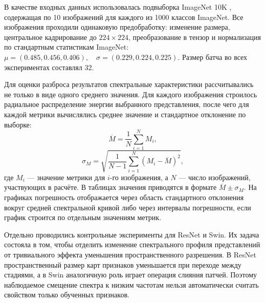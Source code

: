 В качестве входных данных использовалась подвыборка ImageNet 10K \cite{priyerana_imagenet10k}, содержащая по 10 изображений для каждого из 1000 классов ImageNet. Все изображения проходили одинаковую предобработку: изменение размера, центральное кадрирование до $224\times224$, преобразование в тензор и нормализация по стандартным статистикам ImageNet:
$ \mu = (0.485, 0.456, 0.406), \quad
\sigma = (0.229, 0.224, 0.225).$
Размер батча во всех экспериментах составлял 32.

Для оценки разброса результатов спектральные характеристики рассчитывались не только в виде одного среднего значения. Для каждого изображения строилось радиальное распределение энергии выбранного представления, после чего для каждой метрики вычислялись среднее значение и стандартное отклонение по выборке:
\begin{equation}
\overline{M} = \frac{1}{N}\sum_{i=1}^{N} M_i,
\end{equation}
\begin{equation}
\sigma_M = \sqrt{\frac{1}{N-1}\sum_{i=1}^{N}(M_i-\overline{M})^2},
\end{equation}
где $M_i$ — значение метрики для $i$-го изображения, а $N$ — число изображений, участвующих в расчёте. В таблицах значения приводятся в формате $\overline{M}\pm\sigma_M$. На графиках погрешность отображается через область стандартного отклонения вокруг средней спектральной кривой либо через интервалы погрешности, если график строится по отдельным значениям метрик.

Отдельно проводились контрольные эксперименты для ResNet и Swin. Их задача состояла в том, чтобы отделить изменение спектрального профиля представлений от тривиального эффекта уменьшения пространственного разрешения. В ResNet пространственный размер карт признаков уменьшается при переходе между стадиями, а в Swin аналогичную роль играет операция слияния патчей. Поэтому наблюдаемое смещение спектра к низким частотам нельзя автоматически считать свойством только обученных признаков.

